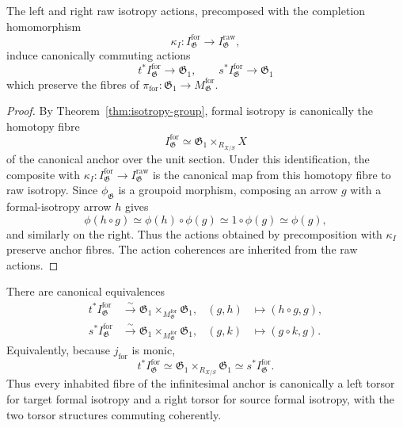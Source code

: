 \begin{proposition}
\label{prop:formal-isotropy-actions}
The left and right raw isotropy actions, precomposed with the completion
homomorphism
\[
    \kappa_I:
    I^{\mathrm{for}}_{\mathfrak G}
    \longrightarrow
    I^{\mathrm{raw}}_{\mathfrak G},
\]
induce canonically commuting actions
\[
    t^*I^{\mathrm{for}}_{\mathfrak G}
    \longrightarrow
    \mathfrak G_1,
    \qquad
    s^*I^{\mathrm{for}}_{\mathfrak G}
    \longrightarrow
    \mathfrak G_1
\]
which preserve the fibres of
$\pi_{\mathrm{for}}:\mathfrak G_1\to
M^{\mathrm{for}}_{\mathfrak G}$.
\end{proposition}

\begin{proof}
By Theorem~\ref{thm:isotropy-group}, formal isotropy is canonically the
homotopy fibre
\[
    I^{\mathrm{for}}_{\mathfrak G}
    \simeq
    \mathfrak G_1\times_{R_{X/S}}X
\]
of the canonical anchor over the unit section.  Under this identification,
the composite with
$\kappa_I:I^{\mathrm{for}}_{\mathfrak G}\to
I^{\mathrm{raw}}_{\mathfrak G}$
is the canonical map from this homotopy fibre to raw isotropy.  Since
$\phi_{\mathfrak G}$ is a groupoid morphism, composing an arrow $g$ with a
formal-isotropy arrow $h$ gives
\[
    \phi(h\circ g)
    \simeq
    \phi(h)\circ\phi(g)
    \simeq
    1\circ\phi(g)
    \simeq
    \phi(g),
\]
and similarly on the right.  Thus the actions obtained by precomposition with
$\kappa_I$ preserve anchor fibres.  The action coherences are inherited from
the raw actions.
\end{proof}

\begin{theorem}
\label{thm:formal-bitorsor}
There are canonical equivalences
\[
\begin{aligned}
    t^*I^{\mathrm{for}}_{\mathfrak G}
    &\xrightarrow{\sim}
    \mathfrak G_1
    \times_{M^{\mathrm{for}}_{\mathfrak G}}
    \mathfrak G_1,
    &
    (g,h)&\longmapsto(h\circ g,g),\\
    s^*I^{\mathrm{for}}_{\mathfrak G}
    &\xrightarrow{\sim}
    \mathfrak G_1
    \times_{M^{\mathrm{for}}_{\mathfrak G}}
    \mathfrak G_1,
    &
    (g,k)&\longmapsto(g\circ k,g).
\end{aligned}
\]
Equivalently, because $j_{\mathrm{for}}$ is monic,
\[
    t^*I^{\mathrm{for}}_{\mathfrak G}
    \simeq
    \mathfrak G_1\times_{R_{X/S}}\mathfrak G_1
    \simeq
    s^*I^{\mathrm{for}}_{\mathfrak G}.
\]
Thus every inhabited fibre of the infinitesimal anchor is canonically a
left torsor for target formal isotropy and a right torsor for source formal
isotropy, with the two torsor structures commuting coherently.
\end{theorem}

